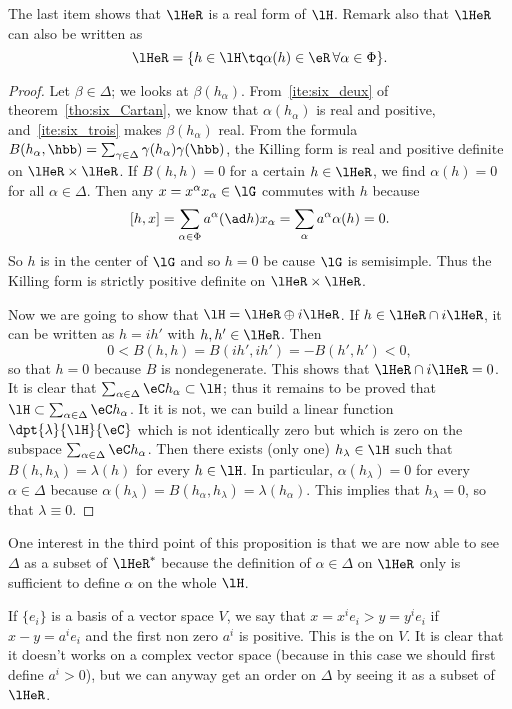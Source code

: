 The last item shows that $\lHeR$ is a real form of $\lH$. Remark also that $\lHeR$ can also be written as
\[
\lHeR=\{h\in\lH\tq \alpha(h)\in\eR\,\forall\alpha\in\Phi \}.
\]
\begin{proof}
Let $\beta\in\Delta$; we looks at $\beta( h_{\alpha})$. From~\ref{ite:six_deux} of theorem~\ref{tho:six_Cartan}, we know that $\alpha( h_{\alpha})$ is real and positive, and~\ref{ite:six_trois} makes $\beta( h_{\alpha})$ real. From the formula $B( h_{\alpha},\hbb)=\sum_{\gamma\in\Delta}\gamma( h_{\alpha})\gamma(\hbb)$, the Killing form is real and positive definite on $\lHeR\times\lHeR$. If $B(h,h)=0$ for a certain $h\in\lHeR$, we find $\alpha(h)=0$ for all $\alpha\in\Delta$. Then any $x=x^{\alpha} x_{\alpha}\in\lG$ commutes with $h$ because
\[
[h,x]=\sum_{\alpha\in\Phi}a^{\alpha}(\ad h) x_{\alpha}=\sum_{\alpha}a^{\alpha}\alpha(h)=0.
\]
So $h$ is in the center of $\lG$ and so $h=0$ be cause $\lG$ is semisimple. Thus the Killing form is strictly positive definite on $\lHeR\times\lHeR$.

Now we are going to show that $\lH=\lHeR\oplus i\lHeR$. If $h\in\lHeR\cap i\lHeR$, it can be written as $h=ih'$ with $h,h'\in\lHeR$. Then
\[
0<B(h,h)=B(ih',ih')=-B(h',h')<0,
\]
so that $h=0$ because $B$ is nondegenerate. This shows that $\lHeR\cap i\lHeR=0$. It is clear that $\sum_{\alpha\in\Delta}\eC h_{\alpha}\subset\lH$; thus it remains to be proved that $\lH\subset\sum_{\alpha\in\Delta}\eC h_{\alpha}$. It it is not, we can build a linear function $\dpt{\lambda}{\lH}{\eC}$ which is not identically zero but which is zero on the subspace $\sum_{\alpha\in\Delta}\eC h_{\alpha}$. Then there exists (only one) $h_{\lambda}\in\lH$ such that $B(h,h_{\lambda})=\lambda(h)$ for every $h\in\lH$. In particular, $\alpha(h_{\lambda})=0$ for every $\alpha\in\Delta$ because $\alpha(h_{\lambda})=B( h_{\alpha},h_{\lambda})=\lambda( h_{\alpha})$. This implies that $h_{\lambda}=0$, so that $\lambda\equiv 0$.

\end{proof}

One interest in the third point of this proposition is that we are now able to see $\Delta$ as a subset of $\lHeR^*$ because the definition of $\alpha\in\Delta$ on $\lHeR$ only is sufficient to define $\alpha$ on the whole $\lH$.

If $\{e_i\}$ is a basis of a vector space $V$, we say that $x=x^ie_i>y=y^ie_i$ if $x-y=a^ie_i$ and the first non zero $a^i$ is positive. This is the  on $V$. It is clear that it doesn't works on a complex vector space (because in this case we should first define $a^i>0$), but we can anyway get an order on $\Delta$ by seeing it as a subset of $\lHeR$.

